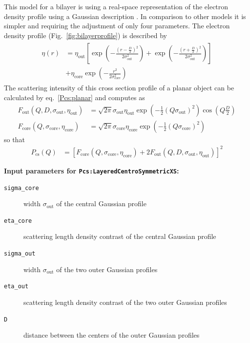This model for a bilayer is using a real-space representation of the electron density profile
using a Gaussian description \cite{Pabst2000,Pabst2003}. In comparison to other models it
is simpler and requiring the adjustment of only four parameters. The electron density profile
(Fig.\ \ref{fig:bilayerprofile}) is described by
\begin{align}
\begin{split}
\eta(r) &=  \eta_\textrm{out} \left[ \exp\left(-\frac{\left(r-\frac{D}{2}\right)^2}{2\sigma_\textrm{out}^2}\right) +
   \exp\left(-\frac{\left(r+\frac{D}{2}\right)^2}{2\sigma_\textrm{out}^2}\right) \right] \\
          &+ \eta_\textrm{core} \exp\left(-\frac{r^2}{2\sigma_\textrm{core}^2}\right)
          \label{eq:BiLayerGaussianProfile}
\end{split}
\end{align}
The scattering intensity of this cross section profile of a planar object can be calculated by eq.\ \ref{Pcs:planar}
and computes as
\begin{align}
   F_\text{out}\left(Q,D,\sigma_\textrm{out},\eta_\textrm{out}\right)  &= \sqrt{2\pi}\sigma_\textrm{out}  \eta_\textrm{out}  \exp\left(-\frac{1}{2}\left(Q\sigma_\textrm{out} \right)^2\right) \cos\left(Q\frac{D}{2}\right) \\
   F_\text{core}\left(Q,\sigma_\textrm{core},\eta_\textrm{core}\right) &= \sqrt{2\pi}\sigma_\textrm{core} \eta_\textrm{core} \exp\left(-\frac{1}{2}\left(Q\sigma_\textrm{core}\right)^2\right)
\end{align}
so that
\begin{align}
  P_\text{cs}\left(Q\right)   &=\left[F_\text{core}\left(Q,\sigma_\textrm{core}, \eta_\textrm{core}\right)
                                   +2 F_\text{out} \left(Q,D,\sigma_\textrm{out},\eta_\textrm{out} \right)\right]^2
  \label{eq:PcsBilayer}
\end{align}

\noindent
\textbf{Input parameters for \texttt{Pcs:LayeredCentroSymmetricXS}:}
\begin{description}
    \item[\texttt{sigma\_core}] width $\sigma_\mathrm{out}$ of the central Gaussian profile
    \item[\texttt{eta\_core}] scattering length density contrast of the central Gaussian profile
    \item[\texttt{sigma\_out}] width $\sigma_\mathrm{out}$ of the two outer Gaussian profiles
    \item[\texttt{eta\_out}] scattering length density contrast of the two outer Gaussian profiles
    \item[\texttt{D}] distance between the centers of the outer Gaussian profiles
\end{description}


